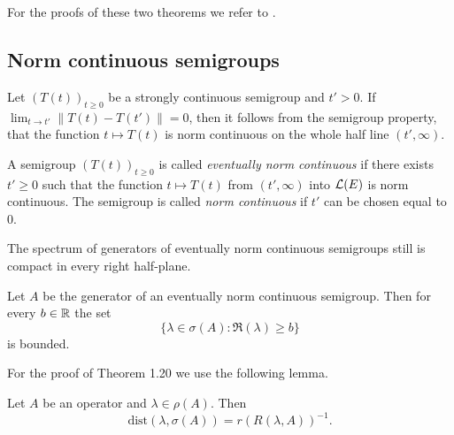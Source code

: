 For the proofs of these two theorems we refer to \citet[Chapter 3, Theorem 4.7 and 4.8]{pazy:1983}.

\subsection{Norm continuous semigroups} \label{subsec:a2-1.se6}%
Let $(T(t))_{t\geq 0}$ be a strongly continuous semigroup and $t' > 0$.
If $\lim_{t \to t'} \|T(t) - T(t')\| = 0$, then it follows from the semigroup property, that the function $t \mapsto T(t)$ is norm continuous on the whole half line $(t',\infty)$.

\begin{definition}\label{def:a2-1.19}
A semigroup $(T(t))_{t\geq 0}$ is called \emph{eventually norm continuous} if there exists $t' \geq 0$ such that the function $t \mapsto T(t)$ from $(t',\infty)$ into $\mathcal{L}(E)$ is norm continuous.
The semigroup is called \emph{norm continuous} if $t'$ can be chosen equal to $0$.
\end{definition}

The spectrum of generators of eventually norm continuous semigroups still is compact in every right half-plane.

\begin{theorem}\label{thm:a2-1.20}
Let $A$ be the generator of an eventually norm continuous semigroup.
Then for every $b \in \mathbb{R}$ the set
\[
    \{\lambda \in \sigma(A) \colon \Re(\lambda) \geq b\}
\]
is bounded.
\end{theorem}
For the proof of Theorem 1.20 we use the following lemma.
\begin{lemma}\label{lem:a2-1.21}
Let $A$ be an operator and $\lambda \in \rho(A)$.
Then
\[
    \text{dist}(\lambda,\sigma(A)) = r(R(\lambda,A))^{-1}.
\]
\end{lemma}

